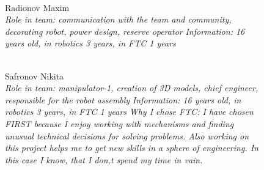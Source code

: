 \begin{figure}[H]
\begin{minipage}[h]{0.47\linewidth}
		\\
		Radionov Maxim\\
		\emph{Role in team: communication with the team and community, decorating robot, power design, reserve operator}
		\emph{Information: 16 years old, in robotics 3 years, in FTC 1 years}
	\end{minipage}
	\center  
	\center  
	\vfill 
	\begin{minipage}[h]{0.47\linewidth}
		\\
		Safronov Nikita\\
		\emph{Role in team: manipulator-1,  creation of 3D models, chief engineer, responsible for the robot assembly}
		\emph{Information: 16 years old, in robotics 3 years, in FTC 1 years} 
		\emph{Why I chose FTC: I have chosen FIRST because I enjoy working with mechanisms and finding unusual technical decisions for solving problems. Also working on this project helps me to get new skills in a sphere of engineering. In this case I know, that I don,t spend my time in vain.}			

\end{minipage}
\end{figure}
